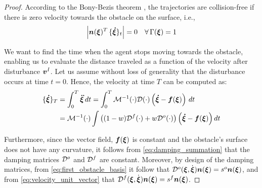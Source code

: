 \iflong
\begin{proof}
According to the Bony-Bezis theorem \parencite{bony1969principe}, the trajectories are collision-free if there is zero velocity towards the obstacle on the surface, i.e.,
\begin{equation}
	\left| \boldsymbol{n}(\boldsymbol{\xi})^T \, \{ \boldsymbol{\dot \xi} \}_{t} \right| = 0 
	\quad \forall \, \Gamma(\boldsymbol{\xi}) = 1
	\label{eq:bezis_theorem}
\end{equation}

We want to find the time when the agent stops moving towards the obstacle, enabling us to evaluate the distance traveled as a function of the velocity after disturbance $\boldsymbol{v}^I$. 
Let us assume without loss of generality that the disturbance occurs at time $t=0$. Hence, the velocity at time $T$ can be computed as:
\begin{equation}
\begin{split}
	\{ \boldsymbol{\dot \xi} \}_{T} 
	& = \int_0^T \boldsymbol{\ddot \xi} \, dt = \int_0^T \mathcal{M}^{-1}(\cdot) \mathcal{D}(\cdot) \left( \boldsymbol{\dot \xi} - \boldsymbol{f}(\boldsymbol{\xi} ) \right) \, dt \\
	& = \mathcal{M}^{-1}(\cdot) \int \left( (1 - w) \mathcal{D}^f(\cdot) + w \mathcal{D}^{o}(\cdot) \right) \left( \boldsymbol{\dot \xi} - \boldsymbol{f} (\boldsymbol{\xi} ) \right) dt \\
	\end{split}
\label{eq:velocity_evolution}
\end{equation}

Furthermore, since the vector field, $\boldsymbol{f}(\boldsymbol{\xi})$ is constant and the obstacle's surface does not have any curvature, it follows from \eqref{eq:damping_summation} that the damping matrices  $\mathcal{D}^o$ and $\mathcal{D}^f$ are constant.
Moreover, by design of the damping matrices, from \eqref{eq:first_obstacle_basis} it follow that $\mathcal{D}^o(\boldsymbol{\xi}, \dot{\boldsymbol{\xi}}) \boldsymbol{n}(\boldsymbol{\xi}) = s^o \boldsymbol{n}(\boldsymbol{\xi})$, and from  \eqref{eq:velocity_unit_vector} that $\mathcal{D}^f(\boldsymbol{\xi}, \dot{\boldsymbol{\xi}}) \boldsymbol{n}(\boldsymbol{\xi}) = s^f \boldsymbol{n}(\boldsymbol{\xi})$. 


\end{proof}
